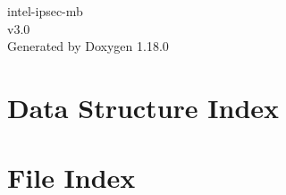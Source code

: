 \documentclass[twoside]{book}
\newcommand{\+}{\discretionary{\mbox{\scriptsize$\hookleftarrow$}}{}{}}
\newcommand{\clearemptydoublepage}{%
    \newpage{\pagestyle{empty}\cleardoublepage}%
  }
\begin{document}
  \raggedbottom
    \hypersetup{pageanchor=false,
                bookmarksnumbered=true,
                pdfencoding=unicode
               }
  \begin{titlepage}
  \vspace*{7cm}
  \begin{center}%
  {\Large intel-\/ipsec-\/mb}\\
  [1ex]\large v3.\+0 \\
  \vspace*{1cm}
  {\large Generated by Doxygen 1.18.0}\\
  \end{center}
  \end{titlepage}
  \clearemptydoublepage
  \tableofcontents
  \clearemptydoublepage
  \hypersetup{pageanchor=true}

\chapter{Data Structure Index}

\chapter{File Index}

\end{document}
